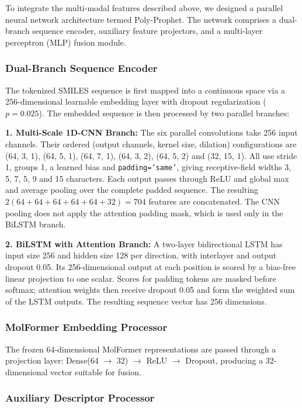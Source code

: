 \documentclass{article}
\begin{document}
To integrate the multi-modal features described above, we designed a parallel neural network architecture termed Poly-Prophet. The network comprises a dual-branch sequence encoder, auxiliary feature projectors, and a multi-layer perceptron (MLP) fusion module.

\subsubsection{Dual-Branch Sequence Encoder}

The tokenized SMILES sequence is first mapped into a continuous space via a 256-dimensional learnable embedding layer with dropout regularization ($p=0.025$). The embedded sequence is then processed by two parallel branches:

\textbf{1. Multi-Scale 1D-CNN Branch:} The six parallel convolutions take 256 input channels. Their ordered (output channels, kernel size, dilation) configurations are (64, 3, 1), (64, 5, 1), (64, 7, 1), (64, 3, 2), (64, 5, 2) and (32, 15, 1). All use stride 1, groups 1, a learned bias and \texttt{padding='same'}, giving receptive-field widths 3, 5, 7, 5, 9 and 15 characters. Each output passes through ReLU and global max and average pooling over the complete padded sequence. The resulting $2(64+64+64+64+64+32)=704$ features are concatenated. The CNN pooling does not apply the attention padding mask, which is used only in the BiLSTM branch.

\textbf{2. BiLSTM with Attention Branch:} A two-layer bidirectional LSTM has input size 256 and hidden size 128 per direction, with interlayer and output dropout 0.05. Its 256-dimensional output at each position is scored by a bias-free linear projection to one scalar. Scores for padding tokens are masked before softmax; attention weights then receive dropout 0.05 and form the weighted sum of the LSTM outputs. The resulting sequence vector has 256 dimensions.

\subsubsection{MolFormer Embedding Processor}

The frozen 64-dimensional MolFormer representations are passed through a projection layer: Dense(64 $\rightarrow$ 32) $\rightarrow$ ReLU $\rightarrow$ Dropout, producing a 32-dimensional vector suitable for fusion.

\subsubsection{Auxiliary Descriptor Processor}
\end{document}
